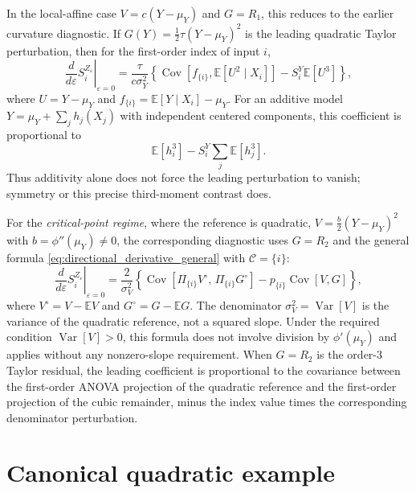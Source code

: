 \documentclass[11pt,letterpaper]{article}
\DeclareMathOperator{\Var}{Var}
\DeclareMathOperator{\Cov}{Cov}
\newcommand{\E}{\mathbb{E}}
\theoremstyle{remark}
\begin{document}
In the local-affine case $V=c(Y-\mu_Y)$ and $G=R_1$, this reduces to the earlier
curvature diagnostic. If $G(Y)=\frac12\tau(Y-\mu_Y)^2$ is the leading quadratic
Taylor perturbation, then for the first-order index of input $i$,
\begin{equation}
  \left.\frac{d}{d\varepsilon}S_i^{Z_\varepsilon}\right|_{\varepsilon=0}
  =\frac{\tau}{c\sigma_Y^2}
  \left\{\Cov[f_{\{i\}},\E[U^2\mid X_i]]-S_i^Y\E[U^3]\right\},
  \label{eq:quadratic_derivative}
\end{equation}
where $U=Y-\mu_Y$ and $f_{\{i\}}=\E[Y\mid X_i]-\mu_Y$. For an additive model
$Y=\mu_Y+\sum_j h_j(X_j)$ with independent centered components, this coefficient
is proportional to
\begin{equation}
  \E[h_i^3]-S_i^Y\sum_j\E[h_j^3].
  \label{eq:third_moment_contrast}
\end{equation}
Thus additivity alone does not force the leading perturbation to vanish;
symmetry or this precise third-moment contrast does.

For the \emph{critical-point regime}, where the reference is quadratic,
$V=\frac{b}{2}(Y-\mu_Y)^2$ with $b=\phi''(\mu_Y)\neq0$, the corresponding
diagnostic uses $G=R_2$ and the general formula \eqref{eq:directional_derivative_general}
with $\mathscr C=\{i\}$:
\begin{equation}
  \left.\frac{d}{d\varepsilon}S_i^{Z_\varepsilon}\right|_{\varepsilon=0}
  =\frac{2}{\sigma_{V}^2}
  \left\{\Cov\!\left[\Pi_{\{i\}}V^\circ,\,\Pi_{\{i\}}G^\circ\right]
         -p_{\{i\}}\Cov[V,G]\right\},
  \label{eq:quadratic_ref_derivative}
\end{equation}
where $V^\circ=V-\E V$ and $G^\circ=G-\E G$. The denominator
$\sigma_V^2=\Var[V]$ is the variance of the quadratic reference, not a squared
slope. Under the required condition $\Var[V]>0$, this formula does not involve
division by $\phi'(\mu_Y)$ and applies without any nonzero-slope requirement. When $G=R_2$ is the order-3 Taylor residual, the leading
coefficient is proportional to the covariance between the first-order ANOVA projection of the
quadratic reference and the first-order projection of the cubic remainder, minus
the index value times the corresponding denominator perturbation.

\section{Canonical quadratic example}
\label{sec:numerical}
\end{document}
